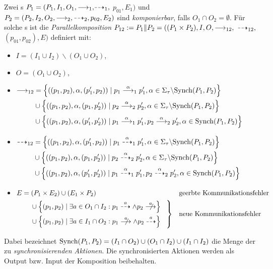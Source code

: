 \begin{Def}[Parallelkomposition]
  \label{ParallelDef}
  Zwei \MEIO{}s $P_1 = (P_1,I_1,O_1,{\must_1,}{\may_1,}$ $p_{01},E_1)$ und $P_2 =
  (P_2,I_2,O_2,\must_2,\may_2,p_{02},E_2)$ sind \emph{komponierbar}, falls
  $O_1\cap O_2=\emptyset$. Für solche \MEIO{}s ist die
  \emph{Parallelkomposition} $P_{12} := P_1\|P_2=((P_1\times P_2), I, O,
  {\must_{12},}$ ${\may_{12},}$ $(p_{01}, p_{02}), E)$ definiert mit:
  \begin{itemize}
    \item $I=(I_1\cup I_2)\backslash (O_1\cup O_2)$,
    \item $O=(O_1\cup O_2)$,
  \item $\begin{aligned}[t]
      \must_{12} & = \left\{\left((p_1,p_2),\alpha,(p_1',p_2)\right) \mid p_1
      \must[\alpha]_1 p_1', \alpha\in\Sigma_{\tau}\backslash
      \Synch(P_1,P_2)\right\}\\
        &\cup \left\{\left((p_1,p_2),\alpha,(p_1,p_2')\right) \mid p_2
      \must[\alpha]_2 p_2', \alpha\in\Sigma_{\tau}\backslash
      \Synch(P_1,P_2)\right\}\\
        &\cup \left\{\left((p_1,p_2),\alpha,(p_1',p_2')\right) \mid p_1
      \must[\alpha]_1 p_1', p_2 \must[\alpha]_2 p_2', \alpha\in
      \Synch(P_1,P_2)\right\}
    \end{aligned}$
  \item $\begin{aligned}[t]
      \may_{12} & = \left\{\left((p_1,p_2),\alpha,(p_1',p_2)\right) \mid p_1
      \may[\alpha]_1 p_1', \alpha\in\Sigma_{\tau}\backslash
      \Synch(P_1,P_2)\right\}\\
        &\cup \left\{\left((p_1,p_2),\alpha,(p_1,p_2')\right) \mid p_2
      \may[\alpha]_2 p_2', \alpha\in\Sigma_{\tau}\backslash
      \Synch(P_1,P_2)\right\}\\
        &\cup \left\{\left((p_1,p_2),\alpha,(p_1',p_2')\right) \mid p_1
      \may[\alpha]_1 p_1', p_2 \may[\alpha]_2 p_2', \alpha\in
      \Synch(P_1,P_2)\right\}
    \end{aligned}$
  \item $\begin{aligned}[t]
      E & = (P_1\times E_2) \cup (E_1\times P_2) &&\text{geerbte
      Kommunikationsfehler}\\
        &\quad\left. \begin{aligned}
        &\cup \left\{(p_1,p_2) \mid \exists a \in O_1\cap I_2 : p_1
        \may[a]\land p_2\nmust[a]\right\}\\
        &\cup \left\{(p_1,p_2) \mid \exists a\in I_1\cap O_2 :
        p_1\nmust[a]\land p_2\may[a]\right\}
        \end{aligned}\hspace{0.3cm}\right\} &&\text{neue Kommunikationsfehler}
    \end{aligned}$
  \end{itemize}
  Dabei bezeichnet $\mathrm{Synch}(P_1,P_2)=(I_1\cap O_2)\cup (O_1\cap I_2)\cup
  (I_1\cap I_2)$ die Menge der zu \emph{synchronisierenden Aktionen}. Die
  synchronisierten Aktionen werden als Output bzw. Input der Komposition
  beibehalten.
\end{Def}

